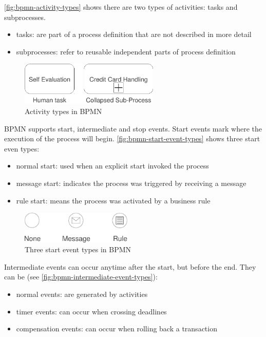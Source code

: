 \autoref{fig:bpmn-activity-types} shows there are two types of activities: tasks and subprocesses.

\begin{itemize}
\item tasks: are part of a process definition that are not described in more detail
\item subprocesses: refer to reusable independent parts of process definition
\end{itemize}

\begin{figure}[H]
\centering
\includegraphics[width=250px,keepaspectratio]{bpmn-activity-types.pdf}
\caption{Activity types in BPMN}
\label{fig:bpmn-activity-types}
\end{figure}

BPMN supports start, intermediate and stop events. Start events mark where the
execution of the process will begin. \autoref{fig:bpmn-start-event-types}
shows three start even types:

\begin{itemize}
\item normal start: used when an explicit start invoked the process
\item message start: indicates the process was triggered by receiving a message
\item rule start: means the process was activated by a business rule
\end{itemize}

\begin{figure}[H]
\centering
\includegraphics[width=200px,keepaspectratio]{bpmn-start-event-types.pdf}
\caption{Three start event types in BPMN}
\label{fig:bpmn-start-event-types}
\end{figure}

Intermediate events can occur anytime after the start, but before the end. They
can be (see \autoref{fig:bpmn-intermediate-event-types}):

\begin{itemize}
\item normal events: are generated by activities
\item timer events: can occur when crossing deadlines
\item compensation events: can occur when rolling back a transaction
\end{itemize}

